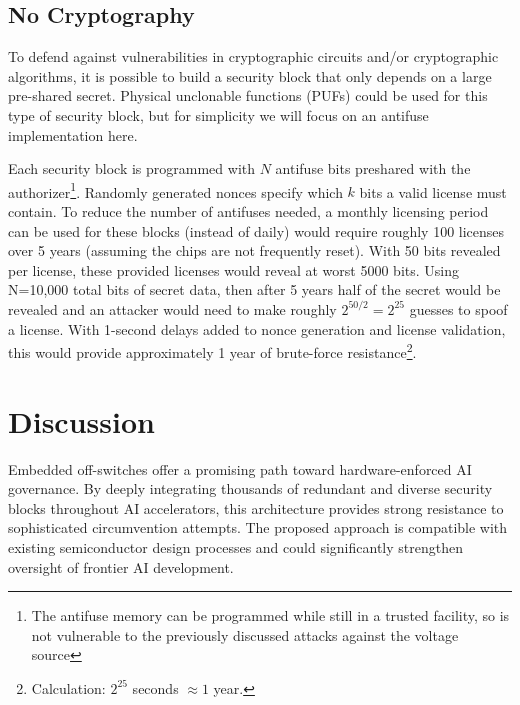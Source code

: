 \documentclass{article}
\begin{document}
\subsection{No Cryptography}

To defend against vulnerabilities in cryptographic circuits and/or cryptographic algorithms, it is possible to build a security block that only depends on a large pre-shared secret. Physical unclonable functions (PUFs) \cite{herder_physical_2014} could be used for this type of security block, but for simplicity we will focus on an antifuse implementation here.

Each security block is programmed with $N$ antifuse bits preshared with the authorizer\footnote{The antifuse memory can be programmed while still in a trusted facility, so is not vulnerable to the previously discussed attacks against the voltage source}. Randomly generated nonces specify which $k$ bits a valid license must contain. To reduce the number of antifuses needed, a monthly licensing period can be used for these blocks (instead of daily) would require roughly 100 licenses over 5 years (assuming the chips are not frequently reset). With 50 bits revealed per license, these provided licenses would reveal at worst 5000 bits. Using N=10,000 total bits of secret data, then after 5 years half of the secret would be revealed and an attacker would need to make roughly $2^{50/2} = 2^{25}$ guesses to spoof a license. With 1-second delays added to nonce generation and license validation, this would provide approximately 1 year of brute-force resistance\footnote{Calculation: $2^{25}$ seconds $\approx 1$ year.}. 



\section{Discussion}
\label{sec:discussion}

Embedded off-switches offer a promising path toward hardware-enforced AI governance. By deeply integrating thousands of redundant and diverse security blocks throughout AI accelerators, this architecture provides strong resistance to sophisticated circumvention attempts. The proposed approach is compatible with existing semiconductor design processes and could significantly strengthen oversight of frontier AI development.
\end{document}
